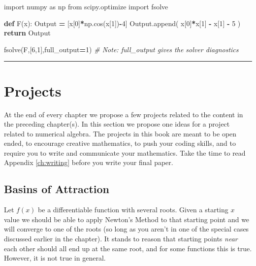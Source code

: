 \documentclass[
]{book}
\newenvironment{Shaded}{\begin{snugshade}}{\end{snugshade}}
\newcommand{\CommentTok}[1]{\textcolor[rgb]{0.56,0.35,0.01}{\textit{#1}}}
\newcommand{\ControlFlowTok}[1]{\textcolor[rgb]{0.13,0.29,0.53}{\textbf{#1}}}
\newcommand{\DecValTok}[1]{\textcolor[rgb]{0.00,0.00,0.81}{#1}}
\newcommand{\ImportTok}[1]{#1}
\newcommand{\KeywordTok}[1]{\textcolor[rgb]{0.13,0.29,0.53}{\textbf{#1}}}
\newcommand{\NormalTok}[1]{#1}
\newcommand{\OperatorTok}[1]{\textcolor[rgb]{0.81,0.36,0.00}{\textbf{#1}}}
\theoremstyle{definition}
\theoremstyle{definition}
\theoremstyle{definition}
\theoremstyle{remark}
\begin{document}
\begin{Shaded}
\begin{Highlighting}[]
\ImportTok{import}\NormalTok{ numpy }\ImportTok{as}\NormalTok{ np}
\ImportTok{from}\NormalTok{ scipy.optimize }\ImportTok{import}\NormalTok{ fsolve}

\KeywordTok{def}\NormalTok{ F(x):}
\NormalTok{  Output }\OperatorTok{=}\NormalTok{ [x[}\DecValTok{0}\NormalTok{]}\OperatorTok{*}\NormalTok{np.cos(x[}\DecValTok{1}\NormalTok{])}\OperatorTok{{-}}\DecValTok{4}\NormalTok{]}
\NormalTok{  Output.append( x[}\DecValTok{0}\NormalTok{]}\OperatorTok{*}\NormalTok{x[}\DecValTok{1}\NormalTok{] }\OperatorTok{{-}}\NormalTok{ x[}\DecValTok{1}\NormalTok{] }\OperatorTok{{-}} \DecValTok{5}\NormalTok{ )}
  \ControlFlowTok{return}\NormalTok{ Output}

\NormalTok{fsolve(F,[}\DecValTok{6}\NormalTok{,}\DecValTok{1}\NormalTok{],full\_output}\OperatorTok{=}\DecValTok{1}\NormalTok{) }\CommentTok{\# Note: full\_output gives the solver diagnostics}
\end{Highlighting}
\end{Shaded}

\begin{center}\rule{0.5\linewidth}{0.5pt}\end{center}

\hypertarget{projects}{%
\section{Projects}\label{projects}}

At the end of every chapter we propose a few projects related to the content in the preceding chapter(s). In this section we propose one ideas for a project related to numerical algebra. The projects in this book are meant to be open ended, to encourage creative mathematics, to push your coding skills, and to require you to write and communicate your mathematics. Take the time to read Appendix \ref{ch:writing} before you write your final paper.

\hypertarget{basins-of-attraction}{%
\subsection{Basins of Attraction}\label{basins-of-attraction}}

Let \(f(x)\) be a differentiable function with several roots. Given a
starting \(x\) value we should be able to apply Newton's Method to that
starting point and we will converge to one of the roots (so long as you
aren't in one of the special cases discussed earlier in the chapter). It
stands to reason that starting points \emph{near} each other should all end
up at the same root, and for some functions this is true. However, it is
not true in general.
\end{document}
